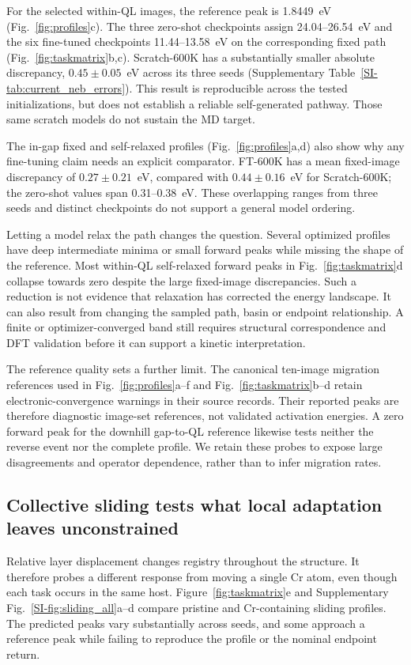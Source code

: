 \documentclass[pdflatex,sn-mathphys-num]{sn-jnl}
\newif\ifreviewcopy
\newcommand{\rev}[2]{\ifreviewcopy{\color{revisionblue}#2\textsuperscript{\scriptsize[R1-#1]}}\else#2\fi}
\newcommand{\sifig}[1]{Supplementary Fig.~\ref{SI-#1}}
\newcommand{\sitab}[1]{Supplementary Table~\ref{SI-#1}}
\begin{document}
For the selected within-QL images, the reference peak is 1.8449~eV (Fig.~\ref{fig:profiles}c). The three zero-shot checkpoints assign 24.04--26.54~eV and the six fine-tuned checkpoints 11.44--13.58~eV on the corresponding fixed path (Fig.~\ref{fig:taskmatrix}b,c). Scratch-600K has a substantially smaller absolute discrepancy, $0.45\pm0.05$~eV across its three seeds (\sitab{tab:current_neb_errors}). \rev{A3}{This result is reproducible across the tested initializations, but does not establish a reliable self-generated pathway.} Those same scratch models do not sustain the MD target.

The in-gap fixed and self-relaxed profiles (Fig.~\ref{fig:profiles}a,d) also show why any fine-tuning claim needs an explicit comparator. FT-600K has a mean fixed-image discrepancy of $0.27\pm0.21$~eV, compared with $0.44\pm0.16$~eV for Scratch-600K; the zero-shot values span 0.31--0.38~eV. These overlapping ranges from three seeds and distinct checkpoints do not support a general model ordering.

Letting a model relax the path changes the question. Several optimized profiles have deep intermediate minima or small forward peaks while missing the shape of the reference. Most within-QL self-relaxed forward peaks in Fig.~\ref{fig:taskmatrix}d collapse towards zero despite the large fixed-image discrepancies. Such a reduction is not evidence that relaxation has corrected the energy landscape. It can also result from changing the sampled path, basin or endpoint relationship. A finite or optimizer-converged band still requires structural correspondence and DFT validation before it can support a kinetic interpretation.

The reference quality sets a further limit. The canonical ten-image migration references used in Fig.~\ref{fig:profiles}a--f and Fig.~\ref{fig:taskmatrix}b--d retain electronic-convergence warnings in their source records. Their reported peaks are therefore diagnostic image-set references, not validated activation energies. A zero forward peak for the downhill gap-to-QL reference likewise tests neither the reverse event nor the complete profile. We retain these probes to expose large disagreements and operator dependence, rather than to infer migration rates.





\subsection{Collective sliding tests what local adaptation leaves unconstrained}\label{sec:sliding}
Relative layer displacement changes registry throughout the structure. It therefore probes a different response from moving a single Cr atom, even though each task occurs in the same host. Figure~\ref{fig:taskmatrix}e and \sifig{fig:sliding_all}a--d compare pristine and Cr-containing sliding profiles. The predicted peaks vary substantially across seeds, and some approach a reference peak while failing to reproduce the profile or the nominal endpoint return.
\end{document}
